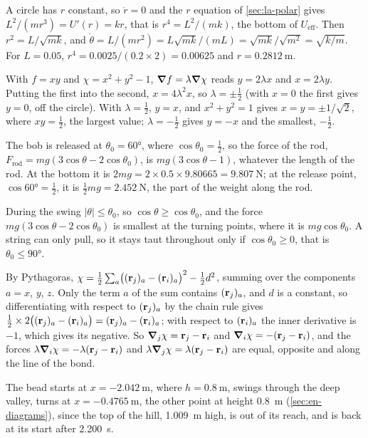 A circle has $r$ constant, so $\ddot{r} = 0$ and
the $r$ equation of \cref{sec:la-polar} gives $L^2/(mr^3) = U'(r) = kr$,
that is $r^4 = L^2/(mk)$, the bottom of $U_{\mathrm{eff}}$. Then $r^2 =
L/\sqrt{mk}$, and $\dot\theta = L/(mr^2) = L\sqrt{mk}/(mL) = \sqrt{mk}/\sqrt{m^2} =
\sqrt{k/m}$.
For $L = 0.05$, $r^4 = 0.0025/(0.2\times2) = 0.00625$ and $r =
\SI{0.2812}{\metre}$.

With $f = xy$ and $\chi = x^2 + y^2 - 1$, $\bm{\nabla} f =
\lambda\bm{\nabla}\chi$ reads $y = 2\lambda x$ and $x = 2\lambda y$. Putting the
first into the second, $x = 4\lambda^2x$, so $\lambda = \pm\frac12$ (with
$x = 0$ the first gives $y = 0$, off the circle). With $\lambda =
\frac12$, $y = x$, and $x^2 + y^2 = 1$ gives $x = y = \pm1/\sqrt2$, where
$xy = \frac12$, the largest value; $\lambda = -\frac12$ gives $y = -x$ and
the smallest, $-\frac12$.

The bob is released at $\theta_0 = \ang{60}$,
where $\cos\theta_0 = \frac12$, so the force of the rod, $F_{\mathrm{rod}}
= mg(3\cos\theta - 2\cos\theta_0)$, is $mg(3\cos\theta - 1)$, whatever the
length of the rod. At the bottom it is
$2mg = 2\times0.5\times9.80665 = \SI{9.807}{\newton}$; at the release
point, $\cos\ang{60} = \frac12$, it is $\frac12 mg = \SI{2.452}{\newton}$,
the part of the weight along the rod.

During the swing $\lvert\theta\rvert \le
\theta_0$, so $\cos\theta \ge \cos\theta_0$, and the force
$mg(3\cos\theta - 2\cos\theta_0)$ is smallest at the turning points, where
it is $mg\cos\theta_0$. A string can only pull, so it stays taut
throughout only if $\cos\theta_0 \ge 0$, that is $\theta_0 \le \ang{90}$.

By Pythagoras, $\chi = \frac12\sum_a\bigl(
(\bm{\mathrm{r}}_j)_a - (\bm{\mathrm{r}}_i)_a\bigr)^2 - \frac12 d^2$, summing over the
components $a = x$, $y$, $z$. Only the term $a$ of the sum contains
$(\bm{\mathrm{r}}_j)_a$, and $d$ is a constant, so differentiating with respect to
$(\bm{\mathrm{r}}_j)_a$ by the chain rule gives $\frac12\times2\bigl((\bm{\mathrm{r}}_j)_a -
(\bm{\mathrm{r}}_i)_a\bigr) = (\bm{\mathrm{r}}_j)_a - (\bm{\mathrm{r}}_i)_a$; with respect to
$(\bm{\mathrm{r}}_i)_a$ the inner derivative is $-1$, which gives its negative. So
$\bm{\nabla}_j\chi = \bm{\mathrm{r}}_j - \bm{\mathrm{r}}_i$ and $\bm{\nabla}_i\chi = -(\bm{\mathrm{r}}_j -
\bm{\mathrm{r}}_i)$, and the forces $\lambda\bm{\nabla}_i\chi = -\lambda(\bm{\mathrm{r}}_j -
\bm{\mathrm{r}}_i)$ and $\lambda\bm{\nabla}_j\chi = \lambda(\bm{\mathrm{r}}_j - \bm{\mathrm{r}}_i)$ are
equal, opposite and along the line of the bond.

The bead starts at $x = \SI{-2.042}{\metre}$,
where $h = \SI{0.8}{\metre}$, swings through the deep valley, turns at $x
= \SI{-0.4765}{\metre}$, the other point at height \SI{0.8}{\metre}
(\cref{sec:en-diagrams}), since the top of the hill, \SI{1.009}{\metre}
high, is out of its reach, and is back at its start after
\SI{2.200}{\second}.
